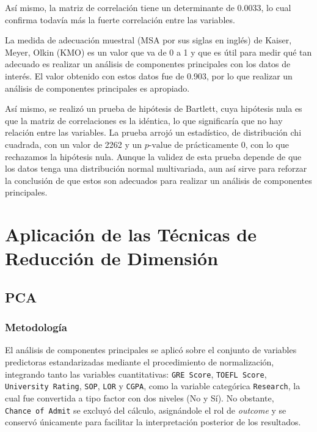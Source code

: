 \documentclass[
  10pt,
  a4paper]{article}
\begin{document}
Así mismo, la matriz de correlación tiene un determinante de 0.0033, lo cual confirma todavía más la fuerte correlación entre las variables.

La medida de adecuación muestral (MSA por sus siglas en inglés) de Kaiser, Meyer, Olkin (KMO) es un valor que va de 0 a 1 y que es útil para medir qué tan adecuado es realizar un análisis de componentes principales con los datos de interés. El valor obtenido con estos datos fue de 0.903, por lo que realizar un análisis de componentes principales es apropiado.

Así mismo, se realizó un prueba de hipótesis de Bartlett, cuya hipótesis nula es que la matriz de correlaciones es la idéntica, lo que significaría que no hay relación entre las variables. La prueba arrojó un estadístico, de distribución chi cuadrada, con un valor de 2262 y un \(p\text{-value}\) de prácticamente 0, con lo que rechazamos la hipótesis nula. Aunque la validez de esta prueba depende de que los datos tenga una distribución normal multivariada, aun así sirve para reforzar la conclusión de que estos son adecuados para realizar un análisis de componentes principales.

\section{Aplicación de las Técnicas de Reducción de Dimensión}\label{aplicaciuxf3n-de-las-tuxe9cnicas-de-reducciuxf3n-de-dimensiuxf3n}

\subsection{PCA}\label{pca}

\subsubsection{Metodología}\label{metodologuxeda}

El análisis de componentes principales se aplicó sobre el conjunto de variables predictoras estandarizadas mediante el procedimiento de normalización, integrando tanto las variables cuantitativas: \texttt{GRE\ Score}, \texttt{TOEFL\ Score}, \texttt{University\ Rating}, \texttt{SOP}, \texttt{LOR} y \texttt{CGPA}, como la variable categórica \texttt{Research}, la cual fue convertida a tipo factor con dos niveles (No y Sí). No obstante, \texttt{Chance\ of\ Admit} se excluyó del cálculo, asignándole el rol de \emph{outcome} y se conservó únicamente para facilitar la interpretación posterior de los resultados.
\end{document}
